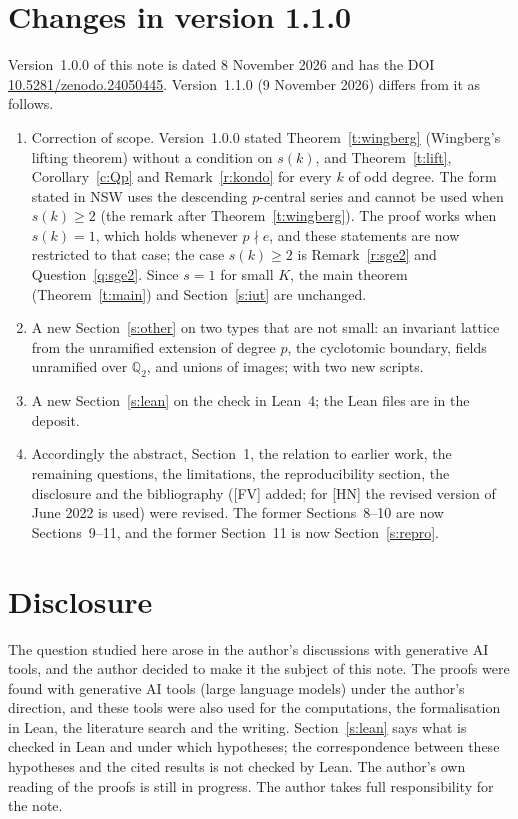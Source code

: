\documentclass[11pt,a4paper]{article}
\theoremstyle{plain}
\theoremstyle{definition}
\theoremstyle{remark}
\begin{document}
\section*{Changes in version 1.1.0}
Version~1.0.0 of this note is dated 8 November 2026 and has the DOI
\href{https://doi.org/10.5281/zenodo.24050445}{10.5281/zenodo.24050445}. Version~1.1.0 (9 November 2026) differs
from it as follows.
\begin{enumerate}[label=(\arabic*)]
\item Correction of scope. Version~1.0.0 stated Theorem~\ref{t:wingberg} (Wingberg's lifting theorem) without a
condition on $s(k)$, and Theorem~\ref{t:lift}, Corollary~\ref{c:Qp} and Remark~\ref{r:kondo} for every $k$ of odd
degree. The form stated in NSW uses the descending $p$-central series and cannot be used when $s(k)\ge2$ (the remark
after Theorem~\ref{t:wingberg}). The proof works when $s(k)=1$, which holds whenever $p\nmid e$, and these statements
are now restricted to that case; the case $s(k)\ge2$ is Remark~\ref{r:sge2} and Question~\ref{q:sge2}. Since $s=1$
for small $K$, the main theorem (Theorem~\ref{t:main}) and Section~\ref{s:iut} are unchanged.
\item A new Section~\ref{s:other} on two types that are not small: an invariant lattice from the unramified extension
of degree $p$, the cyclotomic boundary, fields unramified over $\mathbb Q_2$, and unions of images; with two new
scripts.
\item A new Section~\ref{s:lean} on the check in Lean~4; the Lean files are in the deposit.
\item Accordingly the abstract, Section~1, the relation to earlier work, the remaining questions, the limitations, the
reproducibility section, the disclosure and the bibliography ([FV] added; for [HN] the revised version of June 2022 is
used) were revised. The former Sections~8--10 are now Sections~9--11, and the former Section~11 is now
Section~\ref{s:repro}.
\end{enumerate}

\section*{Disclosure}
The question studied here arose in the author's discussions with generative AI tools, and the author decided to make it
the subject of this note. The proofs were found with generative AI tools (large language models) under the author's
direction, and these tools were also used for the computations, the formalisation in Lean, the literature search and
the writing. Section~\ref{s:lean} says what is checked in Lean and under which hypotheses; the correspondence between
these hypotheses and the cited results is not checked by Lean. The author's own reading of the proofs is still in
progress. The author takes full responsibility for the note.
\end{document}
